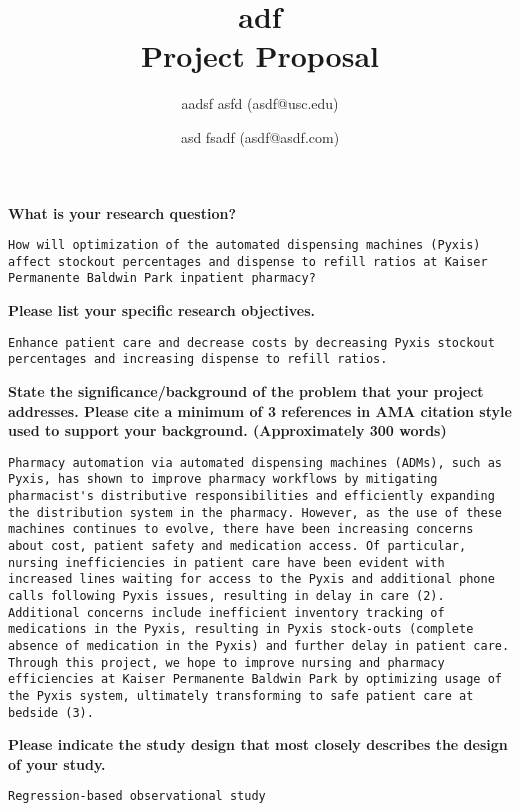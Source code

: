\documentclass[11pt]{article}
\title{\vspace{3in}adf
\\{\small Project Proposal}}
\author[]{aadsf asfd (asdf@usc.edu)}\author[]{asd fsadf (asdf@asdf.com)}
\affil[]{}
\date{}
\begin{document}
\maketitle
\thispagestyle{fancyfirst}
\pagebreak

{\bfseries What is your research question?}
\begin{lstlisting}[mathescape]
How will optimization of the automated dispensing machines (Pyxis) affect stockout percentages and dispense to refill ratios at Kaiser Permanente Baldwin Park inpatient pharmacy? 
\end{lstlisting}
\hfill

{\bfseries Please list your specific research objectives.}
\begin{lstlisting}[mathescape]
Enhance patient care and decrease costs by decreasing Pyxis stockout percentages and increasing dispense to refill ratios. 
\end{lstlisting}
\hfill

{\bfseries State the significance/background of the problem that your project addresses. Please cite a minimum of 3 references in AMA citation style used to support your background. (Approximately 300 words)}
\begin{lstlisting}[mathescape]
Pharmacy automation via automated dispensing machines (ADMs), such as Pyxis, has shown to improve pharmacy workflows by mitigating pharmacist's distributive responsibilities and efficiently expanding the distribution system in the pharmacy. However, as the use of these machines continues to evolve, there have been increasing concerns about cost, patient safety and medication access. Of particular, nursing inefficiencies in patient care have been evident with increased lines waiting for access to the Pyxis and additional phone calls following Pyxis issues, resulting in delay in care (2). Additional concerns include inefficient inventory tracking of medications in the Pyxis, resulting in Pyxis stock-outs (complete absence of medication in the Pyxis) and further delay in patient care. Through this project, we hope to improve nursing and pharmacy efficiencies at Kaiser Permanente Baldwin Park by optimizing usage of the Pyxis system, ultimately transforming to safe patient care at bedside (3). 

\end{lstlisting}
\hfill

{\bfseries Please indicate the study design that most closely describes the design of your study.}
\begin{lstlisting}[mathescape]
Regression-based observational study
\end{lstlisting}
\hfill
\end{document}
